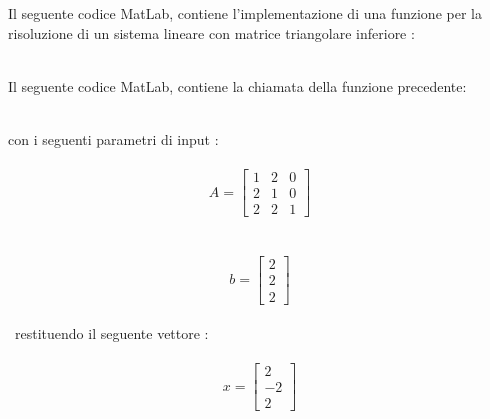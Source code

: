 Il seguente codice MatLab, contiene l'implementazione di una funzione per la risoluzione di un sistema lineare con matrice triangolare inferiore :\\\

Il seguente codice MatLab, contiene la chiamata della funzione precedente:\\\

con i seguenti parametri di input :\\\
\[
A =\begin{bmatrix}
	1 & 2 & 0 \\ 
	2 & 1 & 0 \\
	2 & 2 & 1 
\end{bmatrix}
\]\\\	
\[
b =\begin{bmatrix}
  2 \\
  2 \\
  2
\end{bmatrix}
\]\\\
restituendo il seguente vettore :\\\
\[
x =\begin{bmatrix}
  2 \\
  -2 \\
  2
\end{bmatrix}
\]